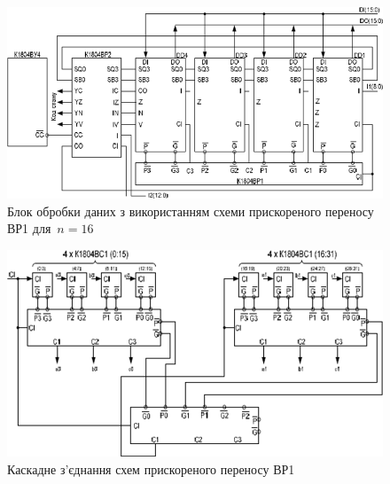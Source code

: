 \documentclass[a4paper,oneside,DIV=12,12pt,headings=normal]{scrartcl}
\begin{document}
				\begin{figure}[!htbp]
					\centering
					\includegraphics[height = 12\baselineskip]{./assets/05-vs1-data-processing-block-fast-shift.png}
					\caption{Блок обробки даних з використанням схеми прискореного переносу ВР1 для~$n = 16$}
					\label{fig:vs1-data-processing-block-fast-shift}
				\end{figure}

				\begin{figure}[!htbp]
					\centering
					\includegraphics[height = 12\baselineskip]{./assets/06-vs1-data-processing-block-fast-shift-cascade.png}
					\caption{Каскадне з'єднання схем прискореного переносу ВР1}
					\label{fig:vs1-data-processing-block-fast-shift-cascade}
				\end{figure}
\end{document}
